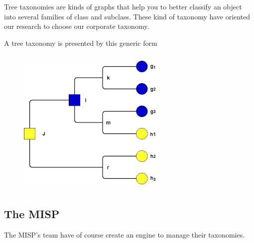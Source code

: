 \documentclass[12pt]{report}
\begin{document}

\vspace{\baselineskip}
Tree taxonomies are kinds of graphs that help you to better classify an object into several families of class and subclass. These kind of  taxonomy have oriented our research to choose our corporate taxonomy. \par

\begin{multicols}{2}

\vspace{\baselineskip}\vspace{\baselineskip}\vspace{\baselineskip}
A tree taxonomy is presented by this generic form \par


\begin{figure}[H]
	\begin{center}		\includegraphics[width=2.82in,height=2.82in]{./media/image5.png}
	\end{center}\end{figure}


\end{multicols}

\newpage

\vspace{\baselineskip}\subsection*{The MISP  }

\vspace{\baselineskip}
The MISP’s team have of course create an engine to manage their taxonomies.  \par
\end{document}

